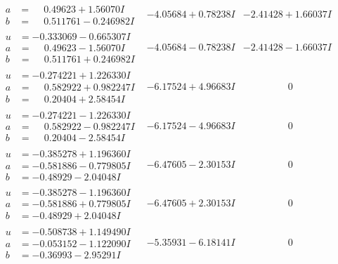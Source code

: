\documentclass[1p]{elsarticle_modified}
\theoremstyle{definition}
\begin{document}
$$\begin{array}{c|c|c}
\begin{aligned}
a &= \phantom{-}0.49623 + 1.56070 I \\
b &= \phantom{-}0.511761 - 0.246982 I\end{aligned}
 & -4.05684 + 0.78238 I & -2.41428 + 1.66037 I \\ \hline\begin{aligned}
u &= -0.333069 - 0.665307 I \\
a &= \phantom{-}0.49623 - 1.56070 I \\
b &= \phantom{-}0.511761 + 0.246982 I\end{aligned}
 & -4.05684 - 0.78238 I & -2.41428 - 1.66037 I \\ \hline\begin{aligned}
u &= -0.274221 + 1.226330 I \\
a &= \phantom{-}0.582922 + 0.982247 I \\
b &= \phantom{-}0.20404 + 2.58454 I\end{aligned}
 & -6.17524 + 4.96683 I & \phantom{-0.000000 } 0 \\ \hline\begin{aligned}
u &= -0.274221 - 1.226330 I \\
a &= \phantom{-}0.582922 - 0.982247 I \\
b &= \phantom{-}0.20404 - 2.58454 I\end{aligned}
 & -6.17524 - 4.96683 I & \phantom{-0.000000 } 0 \\ \hline\begin{aligned}
u &= -0.385278 + 1.196360 I \\
a &= -0.581886 - 0.779805 I \\
b &= -0.48929 - 2.04048 I\end{aligned}
 & -6.47605 - 2.30153 I & \phantom{-0.000000 } 0 \\ \hline\begin{aligned}
u &= -0.385278 - 1.196360 I \\
a &= -0.581886 + 0.779805 I \\
b &= -0.48929 + 2.04048 I\end{aligned}
 & -6.47605 + 2.30153 I & \phantom{-0.000000 } 0 \\ \hline\begin{aligned}
u &= -0.508738 + 1.149490 I \\
a &= -0.053152 - 1.122090 I \\
b &= -0.36993 - 2.95291 I\end{aligned}
 & -5.35931 - 6.18141 I & \phantom{-0.000000 } 0 \\ \hline\begin{aligned}

\end{aligned}
\end{array}$$
\end{document}
